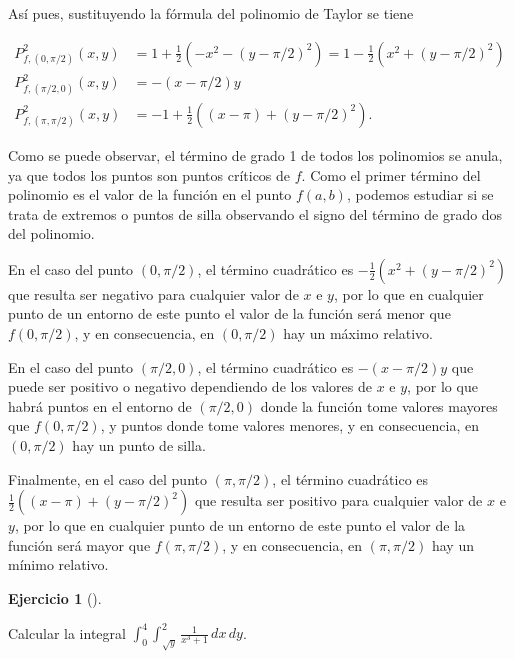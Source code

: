 \documentclass[
  spanish,
  a4paper,
]{scrreport}
\theoremstyle{definition}
\newtheorem{exercise}{Ejercicio}[chapter]
\theoremstyle{remark}
\begin{document}
\begin{tcolorbox}
Así pues, sustituyendo la fórmula del polinomio de Taylor se tiene

\begin{align*}
P^2_{f,(0,\pi/2)}(x,y) 
&= 1 + \frac{1}{2}(-x^2 - (y-\pi/2)^2) = 1 - \frac{1}{2}(x^2 + (y-\pi/2)^2) \\
P^2_{f,(\pi/2, 0)}(x,y) 
&= -(x-\pi/2)y \\
P^2_{f,(\pi,\pi/2)}(x,y) 
&= -1 + \frac{1}{2}((x-\pi) + (y-\pi/2)^2).
\end{align*}

Como se puede observar, el término de grado 1 de todos los polinomios se
anula, ya que todos los puntos son puntos críticos de \(f\). Como el
primer término del polinomio es el valor de la función en el punto
\(f(a,b)\), podemos estudiar si se trata de extremos o puntos de silla
observando el signo del término de grado dos del polinomio.

En el caso del punto \((0,\pi/2)\), el término cuadrático es
\(- \frac{1}{2}(x^2 + (y-\pi/2)^2)\) que resulta ser negativo para
cualquier valor de \(x\) e \(y\), por lo que en cualquier punto de un
entorno de este punto el valor de la función será menor que
\(f(0,\pi/2)\), y en consecuencia, en \((0,\pi/2)\) hay un máximo
relativo.

En el caso del punto \((\pi/2,0)\), el término cuadrático es
\(-(x-\pi/2)y\) que puede ser positivo o negativo dependiendo de los
valores de \(x\) e \(y\), por lo que habrá puntos en el entorno de
\((\pi/2,0)\) donde la función tome valores mayores que \(f(0,\pi/2)\),
y puntos donde tome valores menores, y en consecuencia, en \((0,\pi/2)\)
hay un punto de silla.

Finalmente, en el caso del punto \((\pi,\pi/2)\), el término cuadrático
es \(\frac{1}{2}((x-\pi) + (y-\pi/2)^2)\) que resulta ser positivo para
cualquier valor de \(x\) e \(y\), por lo que en cualquier punto de un
entorno de este punto el valor de la función será mayor que
\(f(\pi,\pi/2)\), y en consecuencia, en \((\pi,\pi/2)\) hay un mínimo
relativo.

\end{tcolorbox}

\begin{exercise}[]\protect\hypertarget{exr-3}{}\label{exr-3}

Calcular la integral
\(\displaystyle \int_0^4\int_{\sqrt{y}}^2 \frac{1}{x^3+1}\,dx\,dy\).

\end{exercise}
\end{document}
